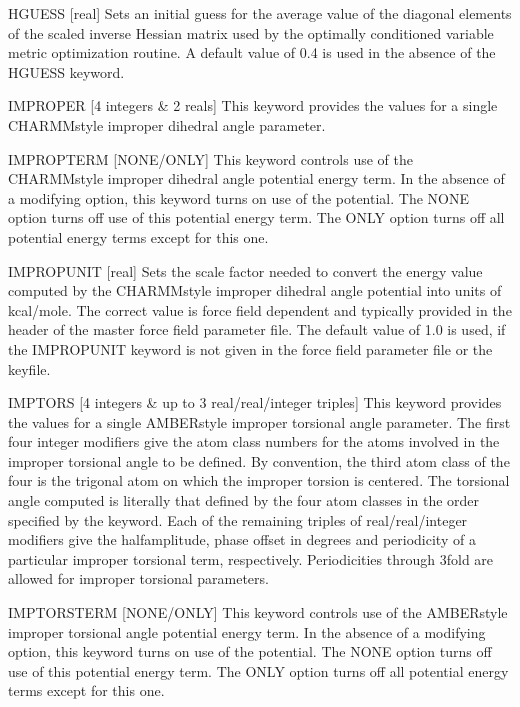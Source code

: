 \documentclass[letterpaper,11pt,english]{sphinxmanual}
\begin{document}
HGUESS {[}real{]}     Sets an initial guess for the average value of the diagonal elements of the scaled inverse Hessian matrix used by the optimally conditioned variable metric optimization routine. A default value of 0.4 is used in the absence of the HGUESS keyword.

IMPROPER {[}4 integers \& 2 reals{]}     This keyword provides the values for a single CHARMM\sphinxhyphen{}style improper dihedral angle parameter.

IMPROPTERM {[}NONE/ONLY{]}     This keyword controls use of the CHARMM\sphinxhyphen{}style improper dihedral angle potential energy term. In the absence of a modifying option, this keyword turns on use of the potential. The NONE option turns off use of this potential energy term. The ONLY option turns off all potential energy terms except for this one.

IMPROPUNIT {[}real{]}     Sets the scale factor needed to convert the energy value computed by the CHARMM\sphinxhyphen{}style improper dihedral angle potential into units of kcal/mole. The correct value is force field dependent and typically provided in the header of the master force field parameter file. The default value of 1.0 is used, if the IMPROPUNIT keyword is not given in the force field parameter file or the keyfile.

IMPTORS {[}4 integers \& up to 3 real/real/integer triples{]}     This keyword provides the values for a single AMBER\sphinxhyphen{}style improper torsional angle parameter. The first four integer modifiers give the atom class numbers for the atoms involved in the improper torsional angle to be defined. By convention, the third atom class of the four is the trigonal atom on which the improper torsion is centered. The torsional angle computed is literally that defined by the four atom classes in the order specified by the keyword. Each of the remaining triples of real/real/integer modifiers give the half\sphinxhyphen{}amplitude, phase offset in degrees and periodicity of a particular improper torsional term, respectively. Periodicities through 3\sphinxhyphen{}fold are allowed for improper torsional parameters.

IMPTORSTERM {[}NONE/ONLY{]}     This keyword controls use of the AMBER\sphinxhyphen{}style improper torsional angle potential energy term. In the absence of a modifying option, this keyword turns on use of the potential. The NONE option turns off use of this potential energy term. The ONLY option turns off all potential energy terms except for this one.
\end{document}
